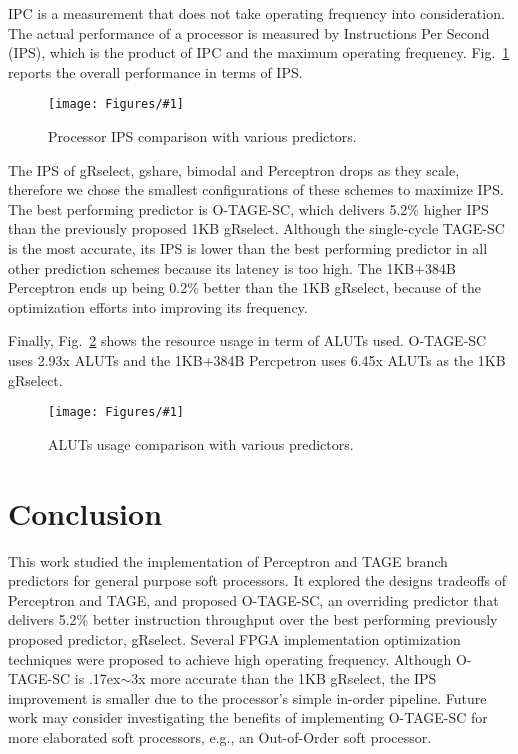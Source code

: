 \documentclass[conference]{IEEEtran}
\newcommand{\mytilde}{{\raise.17ex\hbox{$\scriptstyle\sim$}}}
\newcommand{\kfig}[4]{ %
        \begin{figure}[!t]
        \centering
        \texttt{[image: Figures/\#1]}
        \vspace{-1mm}
        \caption{#3}
        \label{#2}
        \end{figure}
}
\begin{document}
IPC is a measurement that does not take operating frequency into consideration. The actual performance of a processor is measured by Instructions Per Second (IPS), which is the product of IPC and the maximum operating frequency. Fig.~\ref{fig:adips} reports the overall performance in terms of IPS.
\kfig{adips.pdf}{fig:adips}{Processor IPS comparison with various predictors.}{angle = 0, trim = 0.9in 2.7in 0.7in 2.6in, clip, width=0.5\textwidth}

The IPS of gRselect, gshare, bimodal and Perceptron drops as they scale, therefore we chose the smallest configurations of these schemes to maximize IPS. The best performing predictor is \mbox{O-TAGE-SC}, which delivers 5.2\% higher IPS than the previously proposed 1KB gRselect. Although the single-cycle \mbox{TAGE-SC} is the most accurate, its IPS is lower than the best performing predictor in all other prediction schemes  because its latency is too high. The 1KB+384B Perceptron ends up being 0.2\% better than the 1KB gRselect, because of the optimization efforts into improving its frequency. 

Finally, Fig.~\ref{fig:adarea} shows the resource usage in term of ALUTs used. \mbox{O-TAGE-SC} uses 2.93x ALUTs and the 1KB+384B Percpetron uses 6.45x ALUTs as the 1KB gRselect.
\kfig{adarea.pdf}{fig:adarea}{ALUTs usage comparison with various predictors.}{angle = 0, trim = 0.9in 2.7in 0.7in 2.7in, clip, width=0.4\textwidth}

\section{Conclusion}
This work studied the implementation of Perceptron and TAGE branch predictors for general purpose soft processors. It explored the designs tradeoffs of Perceptron and TAGE, and proposed \mbox{O-TAGE-SC}, an overriding predictor that delivers 5.2\% better instruction throughput over the best performing previously proposed predictor, gRselect. Several FPGA implementation optimization techniques were proposed to achieve high operating frequency. Although \mbox{O-TAGE-SC} is \mytilde 3x more accurate than the 1KB gRselect, the IPS improvement is  smaller due to the processor's simple in-order pipeline. Future work may consider investigating the benefits of implementing \mbox{O-TAGE-SC} for more elaborated soft processors, e.g., an Out-of-Order soft processor. 









\end{document}
